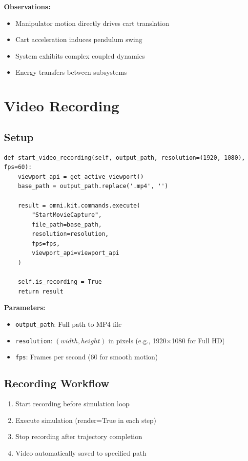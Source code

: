 \documentclass[11pt,a4paper]{article}
\begin{document}
\textbf{Observations:}
\begin{itemize}
    \item Manipulator motion directly drives cart translation
    \item Cart acceleration induces pendulum swing
    \item System exhibits complex coupled dynamics
    \item Energy transfers between subsystems
\end{itemize}

\section{Video Recording}

\subsection{Setup}

\begin{lstlisting}
def start_video_recording(self, output_path, resolution=(1920, 1080), fps=60):
    viewport_api = get_active_viewport()
    base_path = output_path.replace('.mp4', '')
    
    result = omni.kit.commands.execute(
        "StartMovieCapture",
        file_path=base_path,
        resolution=resolution,
        fps=fps,
        viewport_api=viewport_api
    )
    
    self.is_recording = True
    return result
\end{lstlisting}

\textbf{Parameters:}
\begin{itemize}
    \item \texttt{output\_path}: Full path to MP4 file
    \item \texttt{resolution}: $(width, height)$ in pixels (e.g., 1920×1080 for Full HD)
    \item \texttt{fps}: Frames per second (60 for smooth motion)
\end{itemize}

\subsection{Recording Workflow}

\begin{enumerate}
    \item Start recording before simulation loop
    \item Execute simulation (render=True in each step)
    \item Stop recording after trajectory completion
    \item Video automatically saved to specified path
\end{enumerate}
\end{document}
